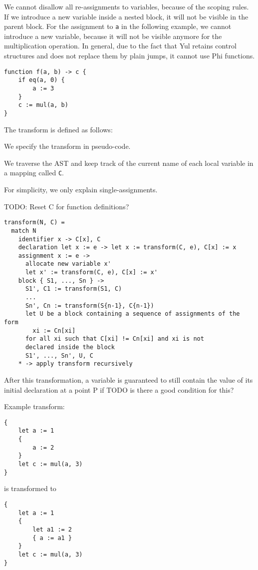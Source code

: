 \documentclass[11pt,letterpaper]{article}
\begin{document}
We cannot disallow all re-assignments to variables, because of the scoping rules.
If we introduce a new variable inside a nested block, it will not be visible in the
parent block. For the assignment to \verb|a| in the following example, we
cannot introduce a new variable, because it will not be visible anymore
for the multiplication operation. In general, due to the fact that Yul
retains control structures and does not replace them by plain jumps,
it cannot use Phi functions.

\begin{verbatim}
function f(a, b) -> c {
    if eq(a, 0) {
        a := 3
    }
    c := mul(a, b)
}
\end{verbatim}

The transform is defined as follows:

We specify the transform in pseudo-code.

We traverse the AST and keep track of the current name of each local variable
in a mapping called \verb|C|.

For simplicity, we only explain single-assignments.

TODO: Reset C for function definitions?

\begin{verbatim}
transform(N, C) =
  match N
    identifier x -> C[x], C
    declaration let x := e -> let x := transform(C, e), C[x] := x
    assignment x := e ->
      allocate new variable x'
      let x' := transform(C, e), C[x] := x'
    block { S1, ..., Sn } ->
      S1', C1 := transform(S1, C)
      ...
      Sn', Cn := transform(S{n-1}, C{n-1})
      let U be a block containing a sequence of assignments of the form
        xi := Cn[xi]
      for all xi such that C[xi] != Cn[xi] and xi is not
      declared inside the block
      S1', ..., Sn', U, C
    * -> apply transform recursively
\end{verbatim}

After this transformation, a variable is guaranteed to still contain
the value of its initial declaration at a point P if TODO is there a
good condition for this?

Example transform:

\begin{verbatim}
{
    let a := 1
    {
        a := 2
    }
    let c := mul(a, 3)
}
\end{verbatim}
is transformed to
\begin{verbatim}
{
    let a := 1
    {
        let a1 := 2
        { a := a1 }
    }
    let c := mul(a, 3)
}
\end{verbatim}
\end{document}
